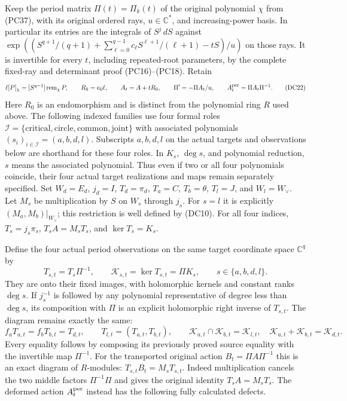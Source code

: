 Keep the period matrix $\Pi(t)=\Pi_k(t)$ of the original polynomial
$\chi$ from (PC37), with its original ordered rays, $u\in\mathbb C^*$,
and increasing-power basis.  In particular its entries are the
integrals of $S^j\,dS$ against
$\exp((S^{q+1}/(q+1)+\sum_{\ell=0}^{q-1}c_\ell
S^{\ell+1}/(\ell+1)-tS)/u)$ on those rays.  It is invertible for
every $t$, including repeated-root parameters, by the complete
fixed-ray and determinant proof (PC16)--(PC18).  Retain
\[
 \ell[P]_\chi=[S^{q-1}]\operatorname{rem}_\chi P,\qquad
 R_0=e_0\ell,\qquad
 A_t=A+tR_0,\qquad
 \Pi'=-\Pi A_t/u,\qquad
 A_t^{\rm per}=\Pi A_t\Pi^{-1}.
 \tag{DC22}
\]
Here $R_0$ is an endomorphism and is distinct from the polynomial
ring $R$ used above.
The following indexed families use four formal roles
$\mathcal I=\{\mathrm{critical},\mathrm{circle},
\mathrm{common},\mathrm{joint}\}$ with associated polynomials
$(s_i)_{i\in\mathcal I}=(a,b,d,l)$.
Subscripts $a,b,d,l$ on the actual targets and observations below
are shorthand for these four roles.  In $K_s$, $\deg s$,
and polynomial reduction, $s$ means the associated polynomial.
Thus even if two or all four polynomials coincide, their four
actual target realizations and maps remain separately specified.
Set $W_d=E_d$, $j_d=I$, $T_d=\pi_d$, $T_a=C$,
$T_b=\theta$, $T_l=J$, and $W_l=W_\vee$.
Let $M_s$ be multiplication by $S$ on $W_s$ through $j_s$.
For $s=l$ it is explicitly $(M_a,M_b)|_{W_\vee}$; this
restriction is well defined by (DC10).  For all four indices,
$T_s=j_s\pi_s$, $T_sA=M_sT_s$, and $\ker T_s=K_s$.

Define the four actual period observations on the same target
coordinate space $\mathbb C^q$ by
\[
 T_{s,t}=T_s\Pi^{-1},\qquad
 \mathcal K_{s,t}=\ker T_{s,t}=\Pi K_s,
 \qquad s\in\{a,b,d,l\}.
 \tag{DC23}
\]
They are onto their fixed images, with holomorphic kernels and
constant ranks $\deg s$.  If $j_s^{-1}$ is followed by any
polynomial representative of degree less than $\deg s$, its
composition with $\Pi$ is an explicit holomorphic right inverse
of $T_{s,t}$.  The diagram remains exactly the same:
\[
 f_aT_{a,t}=f_bT_{b,t}=T_{d,t},\qquad
 T_{l,t}=(T_{a,t},T_{b,t}),\qquad
 \mathcal K_{a,t}\cap\mathcal K_{b,t}=\mathcal K_{l,t},\quad
 \mathcal K_{a,t}+\mathcal K_{b,t}=\mathcal K_{d,t}.
 \tag{DC24}
\]
Every equality follows by composing its previously proved source
equality with the invertible map $\Pi^{-1}$.
For the transported original action
$B_t=\Pi A\Pi^{-1}$ this is an exact diagram of $R$-modules:
$T_{s,t}B_t=M_sT_{s,t}$.  Indeed multiplication cancels the two
middle factors $\Pi^{-1}\Pi$ and gives the original identity
$T_sA=M_sT_s$.  The deformed action $A_t^{\rm per}$ instead has
the following fully calculated defects.


